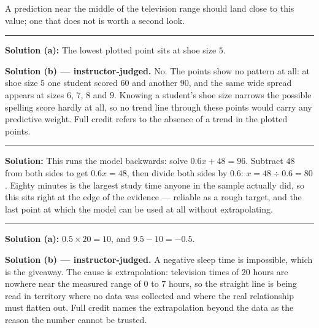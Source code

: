 \documentclass[12pt]{article}
\begin{document}
\noindent A prediction near the middle of the television range should land close to this value; one
that does not is worth a second look.

\vspace{0.15cm}\noindent\rule{\linewidth}{0.2pt}


\textbf{Solution (a):} \quad The lowest plotted point sits at shoe size $5$. 

\noindent\textbf{Solution (b) --- instructor-judged.} No. The points show no pattern at all: at
shoe size $5$ one student scored $60$ and another $90$, and the same wide spread appears at sizes
$6$, $7$, $8$ and $9$. Knowing a student's shoe size narrows the possible spelling score hardly at
all, so no trend line through these points would carry any predictive weight. Full credit refers to
the absence of a trend in the plotted points.

\vspace{0.15cm}\noindent\rule{\linewidth}{0.2pt}


\textbf{Solution:} \quad This runs the model backwards: solve $0.6x + 48 = 96$.
Subtract $48$ from both sides to get $0.6x = 48$, then divide both sides by $0.6$:
$x = 48 \div 0.6 = 80$. Eighty minutes is the largest study time anyone in the sample actually did,
so this sits right at the edge of the evidence --- reliable as a rough target, and the last point at
which the model can be used at all without extrapolating. 

\vspace{0.15cm}\noindent\rule{\linewidth}{0.2pt}


\textbf{Solution (a):} \quad $0.5 \times 20 = 10$, and $9.5 - 10 = -0.5$.

\noindent\textbf{Solution (b) --- instructor-judged.} A negative sleep time is impossible, which is
the giveaway. The cause is extrapolation: television times of $20$ hours are nowhere near the
measured range of $0$ to $7$ hours, so the straight line is being read in territory where no data
was collected and where the real relationship must flatten out. Full credit names the extrapolation
beyond the data as the reason the number cannot be trusted.
\end{document}

